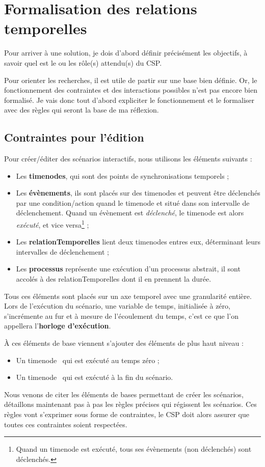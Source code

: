 \chapter{Formalisation des relations temporelles}
Pour arriver à une solution, je dois d'abord définir précisément les objectifs, à savoir quel est le ou les rôle(s) attendu(s) du CSP.

Pour orienter les recherches, il est utile de partir sur une base bien définie. Or, le fonctionnement des contraintes et des interactions possibles n'est pas encore bien formalisé. Je vais donc tout d'abord expliciter le fonctionnement et le formaliser avec des règles qui seront la base de ma réflexion.

\section{Contraintes pour l'édition}

Pour créer/éditer des scénarios interactifs, nous utilisons les éléments suivants :

\begin{itemize}
    \item Les \textbf{\glspl{timenode}}, qui sont des points de synchronisations temporels ;
    \item Les \textbf{évènements}, ils sont placés sur des \glspl{timenode} et peuvent être déclenchés par une condition/action quand le \gls{timenode} et situé dans son intervalle de déclenchement. Quand un évènement est \emph{déclenché}, le \gls{timenode} est alors \emph{exécuté}, et vice versa\footnote{Quand un \gls{timenode} est exécuté, tous ses évènements (non déclenchés) sont déclenchés.} ;
    \item Les \textbf{\glspl{relationTemporelle}} lient deux \glspl{timenode} entres eux, déterminant leurs intervalles de déclenchement ;
    \item Les \textbf{processus} représente une exécution d'un processus abstrait, il sont accolés à des \glspl{relationTemporelle} dont il en prennent la durée.
\end{itemize}

Tous ces éléments sont placés sur un axe temporel avec une granularité entière. Lors de l'exécution du scénario, une variable de temps, initialisée à zéro, s'incrémente au fur et à mesure de l'écoulement du temps, c'est ce que l'on appellera l'\textbf{horloge d'exécution}.

À ces éléments de base viennent s'ajouter des éléments de plus haut niveau :
\begin{itemize}
    \item Un \gls{timenode} \startNode{}~qui est exécuté au temps zéro ;
    \item Un \gls{timenode} \finalNode{}~qui est exécuté à la fin du scénario.
\end{itemize}
Nous venons de citer les éléments de bases permettant de créer les scénarios, détaillons maintenant pas à pas les règles précises qui régissent les scénarios. Ces règles vont s'exprimer sous forme de contraintes, le CSP doit alors assurer que toutes ces contraintes soient respectées.

